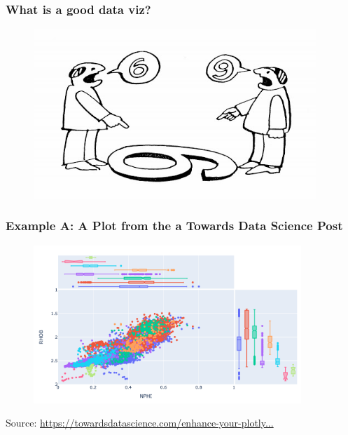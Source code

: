 \documentclass[notes, aspectratio=1610]{beamer}
\begin{document}
\begin{frame}
	\frametitle{What is a good data viz?}
	\begin{figure}
		\begin{small}
			\begin{center}
				\includegraphics[width=0.95\textwidth]{images/subjectivity.jpg}
			\end{center}
		\end{small}
	\end{figure}
\end{frame}

\begin{frame}
	\frametitle{Example A: A Plot from the a Towards Data Science Post}
	\begin{figure}
		\begin{small}
			\begin{center}
				\includegraphics[width=0.9\textwidth]{images/plotly_scatter.png}
			\end{center}
		\end{small}
	\end{figure}

	\vspace{-1em}

	\footnotesize
	Source: \href{https://towardsdatascience.com/enhance-your-plotly-express-scatter-plot-with-marginal-plots-de469d42f12a}
	{https://towardsdatascience.com/enhance-your-plotly...}
\end{frame}
\end{document}
